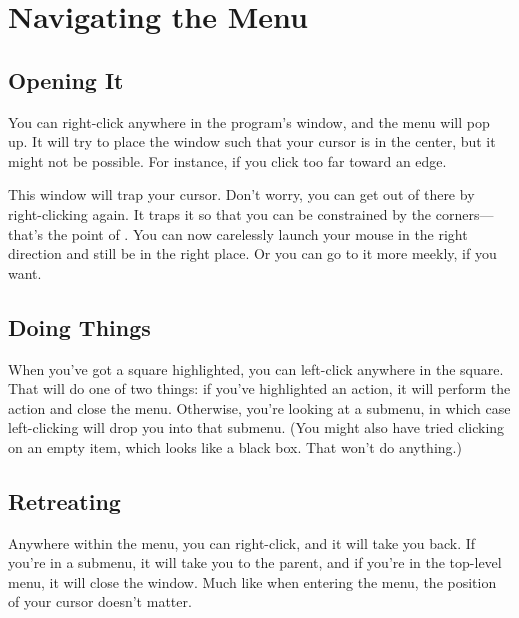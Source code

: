 
\section{Navigating the Menu}


\subsection{Opening It}

You can right-click anywhere in the program's window, and the \fc{} menu will
pop up.  It will try to place the window such that your cursor is in the
center, but it might not be possible.  For instance, if you click too far
toward an edge.

This window will trap your cursor.  Don't worry, you can get out of there by
right-clicking again.  It traps it so that you can be constrained by the
corners---that's the point of \fc.  You can now carelessly launch your mouse
in the right direction and still be in the right place.  Or you can go to it
more meekly, if you want.


\subsection{Doing Things}

When you've got a square highlighted, you can left-click anywhere in the
square.  That will do one of two things: if you've highlighted an action, it
will perform the action and close the menu.  Otherwise, you're looking at a
submenu, in which case left-clicking will drop you into that submenu.  (You
might also have tried clicking on an empty item, which looks like a black box.
That won't do anything.)


\subsection{Retreating}

Anywhere within the \fc{} menu, you can right-click, and it will take you
back.  If you're in a submenu, it will take you to the parent, and if you're
in the top-level menu, it will close the window.  Much like when entering the
menu, the position of your cursor doesn't matter.


